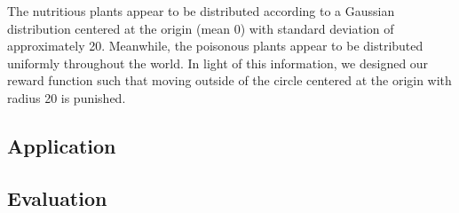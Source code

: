 \documentclass[solution, letterpaper]{cs121}
\begin{document}
The nutritious plants appear to be distributed according to a Gaussian distribution centered at the origin (mean 0) with standard deviation of approximately 20. Meanwhile, the poisonous plants appear to be distributed uniformly throughout the world. In light of this information, we designed our reward function such that moving outside of the circle centered at the origin with radius 20 is punished.

\subsection{Application}
\subsection{Evaluation}
\end{document}
